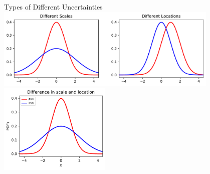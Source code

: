
\begin{frame}{Types of Different Uncertainties}
\centering
	\includegraphics[width=0.8\textwidth]{../../figs/2GaussianPDFs2Scales2Locations.pdf}
	\includegraphics[width=0.4\textwidth]{../../figs/pdfs_diff_scale_and_loc.pdf}
\end{frame}


